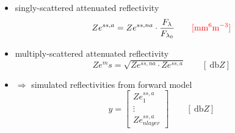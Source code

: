 \begin{itemize}
\begin{itemize}
		$\left\| K_w \right\|^2$ complex refractive index of water and varies between \numlist{0.91;0.93} for wavelength between \SIlist{0.01;0.10}{\metre} and independent of temperature. It also exists a  complex refractive index for ice $\left\| K_i \right\|^2$, which is \SI{0.18}{}. This is valid for density \SI{0.917}{\gram\per\cubic\cm} and is independent of temperature and of wavelength in the microwave region \citep{doviak_doppler_1993}. In this work  $\left\| K_w \right\|^2 = 0.93$ is chosen, \textcolor{red}{because ???} \\
		\item singly-scattered attenuated reflectivity 
		$$Ze^{ss, a} = Ze^{ss, na} \cdot \frac{F_{\lambda}}{F_{\lambda_0}} \qquad \textcolor{red}{[\SI{}{\mm^6\metre^{-3}}]}$$
		\item multiply-scattered attenuated reflectivity 
		$$Ze^ms = \sqrt{Ze^{ss,na} \cdot Ze^{ss,a}} \qquad [\SI{}{\decibel Z}]$$ 
		\item $\Rightarrow$ simulated reflectivities from forward model 
		$$y = \begin{bmatrix} 
		Ze^{ss,a}_1 \\
		\vdots \\
		Ze^{ss,a}_{nlayer}
		\end{bmatrix} \qquad [\SI{}{\decibel Z}]$$
	\end{itemize}
\end{itemize}


% 


% 
% 

